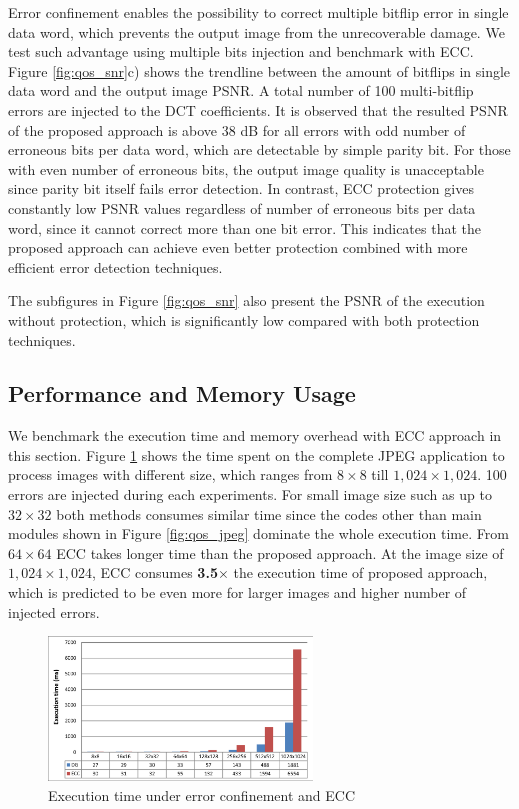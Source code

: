 Error confinement enables the possibility to correct multiple bitflip error in single data word, which prevents the output image from the unrecoverable damage. We test such advantage using multiple bits injection and benchmark with ECC. Figure \ref{fig:qos_snr}c) shows the trendline between the amount of bitflips in single data word and the output image PSNR. A total number of 100 multi-bitflip errors are injected to the DCT coefficients. It is observed that the resulted PSNR of the proposed approach is above 38 dB for all errors with odd number of erroneous bits per data word, which are detectable by simple parity bit. For those with even number of erroneous bits, the output image quality is unacceptable since parity bit itself fails error detection. In contrast, ECC protection gives constantly low PSNR values regardless of number of erroneous bits per data word, since it cannot correct more than one bit error. This indicates that the proposed approach can achieve even better protection combined with more efficient error detection techniques.

The subfigures in Figure \ref{fig:qos_snr} also present the PSNR of the execution without protection, which is significantly low compared with both protection techniques.

\subsection{Performance and Memory Usage} \label{sec::soft_overhead}
We benchmark the execution time and memory overhead with ECC approach in this section. Figure \ref{fig:qos_time} shows the time spent on the complete JPEG application to process images with different size, which ranges from $8 \times 8$ till $1,024 \times 1,024$. 100 errors are injected during each experiments. For small image size such as up to $32 \times 32$ both methods consumes similar time since the codes other than main modules shown in Figure \ref{fig:qos_jpeg} dominate the whole execution time. From $64 \times 64$ ECC takes longer time than the proposed approach. At the image size of $1,024 \times 1,024$, ECC consumes \textbf{3.5}$\times$ the execution time of proposed approach, which is predicted to be even more for larger images and higher number of injected errors.


\begin{figure}
\centering
\includegraphics[width=70mm]{./eps/qos_time}
\caption{Execution time under error confinement and ECC}
\vspace{-4mm}
\label{fig:qos_time}
\end{figure}


